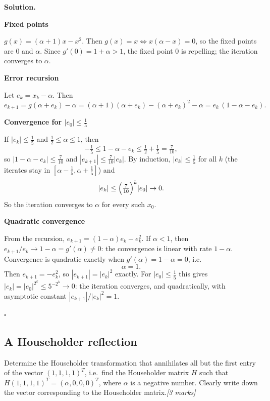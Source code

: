 \documentclass[11pt,a4paper]{article}
\newenvironment{solution}
  {\par\noindent\textbf{Solution.}\par\nobreak}
  {\par\hfill\(\square\)\par}
\newcommand{\step}[1]{\par\addvspace{0.5em}\noindent\textbf{#1}\par\nobreak}
\newcommand{\mk}[1]{\hfill\textit{[#1 marks]}}
\begin{document}
\begin{solution}
\step{Fixed points}
\(g(x)=(\alpha+1)x-x^2\).  Then \(g(x)=x\iff x(\alpha-x)=0\), so the
fixed points are \(0\) and \(\alpha\).  Since \(g'(0)=1+\alpha>1\), the
fixed point \(0\) is repelling; the iteration converges to \(\alpha\).

\step{Error recursion}
Let \(e_k=x_k-\alpha\).  Then
\[
  e_{k+1}=g(\alpha+e_k)-\alpha
  =(\alpha+1)(\alpha+e_k)-(\alpha+e_k)^2-\alpha
  =e_k\,(1-\alpha-e_k).
\]

\step{Convergence for \(|e_0|\le\frac15\)}
If \(|e_k|\le\frac15\) and \(\frac12\le\alpha\le1\), then
\[
  -\tfrac15\le1-\alpha-e_k\le\tfrac12+\tfrac15=\tfrac7{10},
\]
so \(|1-\alpha-e_k|\le\frac7{10}\) and \(|e_{k+1}|\le\frac7{10}|e_k|\).
By induction, \(|e_k|\le\frac15\) for all \(k\) (the iterates stay in
\([\alpha-\frac15,\alpha+\frac15]\)) and
\[
  |e_k|\le\Bigl(\tfrac7{10}\Bigr)^k|e_0|\to0 .
\]
So the iteration converges to \(\alpha\) for every such \(x_0\).

\step{Quadratic convergence}
From the recursion,
\(e_{k+1}=(1-\alpha)e_k-e_k^2\).  If \(\alpha<1\), then
\(e_{k+1}/e_k\to1-\alpha=g'(\alpha)\ne0\): the convergence is linear
with rate \(1-\alpha\).  Convergence is quadratic exactly when
\(g'(\alpha)=1-\alpha=0\), i.e.
\[
  \alpha=1 .
\]
Then \(e_{k+1}=-e_k^2\), so \(|e_{k+1}|=|e_k|^2\) exactly.  For
\(|e_0|\le\frac15\) this gives \(|e_k|=|e_0|^{2^k}\le5^{-2^k}\to0\): the
iteration converges, and quadratically, with asymptotic constant
\(|e_{k+1}|/|e_k|^2=1\).
\end{solution}

\subsection{A Householder reflection}

\begin{qbox}
Determine the Householder transformation that annihilates all but the
first entry of the vector \((1,1,1,1)^T\), i.e.\ find the Householder
matrix \(H\) such that \(H(1,1,1,1)^T=(\alpha,0,0,0)^T\), where
\(\alpha\) is a negative number.  Clearly write down the vector
corresponding to the Householder matrix.\mk{3}
\end{qbox}
\end{document}
